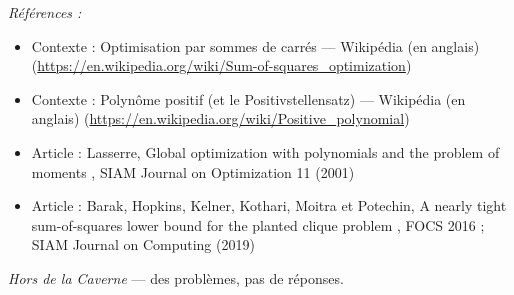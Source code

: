 \documentclass[11pt]{article}
\newenvironment{refs}{\par\small\noindent\emph{Références :}\begin{itemize}\setlength\itemsep{0pt}}{\end{itemize}\normalsize}
\begin{document}
\begin{refs}
\item Contexte : Optimisation par sommes de carrés --- Wikipédia (en anglais) (\url{https://en.wikipedia.org/wiki/Sum-of-squares_optimization})
\item Contexte : Polynôme positif (et le Positivstellensatz) --- Wikipédia (en anglais) (\url{https://en.wikipedia.org/wiki/Positive_polynomial})
\item Article : Lasserre, \og{} Global optimization with polynomials and the problem of moments \fg{}, SIAM Journal on Optimization 11 (2001)
\item Article : Barak, Hopkins, Kelner, Kothari, Moitra et Potechin, \og{} A nearly tight sum-of-squares lower bound for the planted clique problem \fg{}, FOCS 2016 ; SIAM Journal on Computing (2019)
\end{refs}

\bigskip


\vfill
\noindent\emph{Hors de la Caverne} --- des probl\`emes, pas de r\'eponses.
\end{document}
